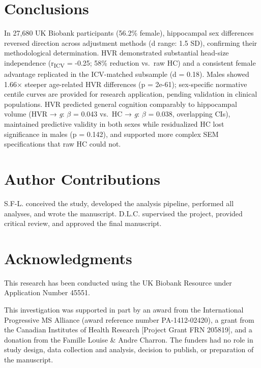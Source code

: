 \documentclass[
]{article}
\begin{document}
\section{Conclusions}\label{conclusions}

In 27,680 UK Biobank participants (56.2\% female), hippocampal sex
differences reversed direction across adjustment methods (d range: 1.5
SD), confirming their methodological determination. HVR demonstrated
substantial head-size independence (r\textsubscript{ICV} = -0.25; 58\%
reduction vs.~raw HC) and a consistent female advantage replicated in
the ICV-matched subsample (d = 0.18). Males showed 1.66× steeper
age-related HVR differences (p = 2e-61); sex-specific normative centile
curves are provided for research application, pending validation in
clinical populations. HVR predicted general cognition comparably to
hippocampal volume (HVR → \emph{g}: \(\beta\) = 0.043 vs.~HC → \emph{g}:
\(\beta\) = 0.038, overlapping CIs), maintained predictive validity in
both sexes while residualized HC lost significance in males (p = 0.142),
and supported more complex SEM specifications that raw HC could not.

\section*{Author Contributions}\label{author-contributions}

S.F-L. conceived the study, developed the analysis pipeline, performed
all analyses, and wrote the manuscript. D.L.C. supervised the project,
provided critical review, and approved the final manuscript.

\section*{Acknowledgments}\label{acknowledgments}

This research has been conducted using the UK Biobank Resource under
Application Number 45551.

This investigation was supported in part by an award from the
International Progressive MS Alliance (award reference number
PA-1412-02420), a grant from the Canadian Institutes of Health Research
{[}Project Grant FRN 205819{]}, and a donation from the Famille Louise
\& Andre Charron. The funders had no role in study design, data
collection and analysis, decision to publish, or preparation of the
manuscript.
\end{document}
